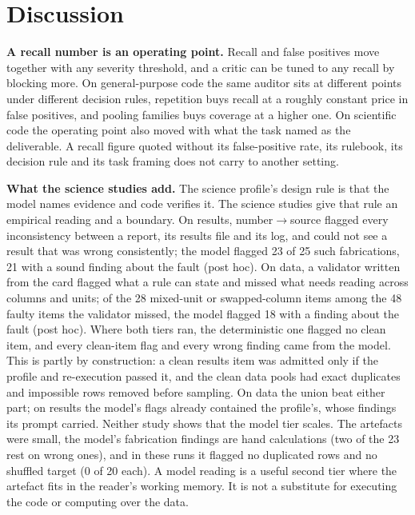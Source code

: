 \section{Discussion}
\label{sec:discussion}

\textbf{A recall number is an operating point.} Recall and false positives move together with any
severity threshold, and a critic can be tuned to any recall by blocking more. On general-purpose code
the same auditor sits at different points under different decision rules, repetition buys recall at
a roughly constant price in false positives, and pooling families buys coverage at a higher one. On
scientific code the operating point also moved with what the task named as the deliverable. A recall
figure quoted without its false-positive rate, its rulebook, its decision rule and its task framing
does not carry to another setting.

\textbf{What the science studies add.} The science profile's design rule is that the model names
evidence and code verifies it. The science studies give that rule an empirical reading and a
boundary. On results, number$\to$source flagged every inconsistency between a report, its results
file and its log, and could not see a result that was wrong consistently; the model flagged 23 of 25
such fabrications, 21 with a sound finding about the fault (post hoc). On data, a validator written
from the card flagged what a rule can state and missed what needs reading across columns and units;
of the 28 mixed-unit or swapped-column items among the 48 faulty items the validator missed, the model flagged 18 with a finding about the fault (post
hoc). Where both tiers ran, the deterministic one flagged no clean item, and every clean-item flag and every wrong finding came from the model. This is partly by construction: a clean results item was admitted only if the profile and re-execution passed it, and the clean data pools had exact duplicates and impossible rows removed before sampling. On data the union beat either part; on results the model's
flags already contained the profile's, whose findings its prompt carried. Neither study shows that
the model tier scales. The artefacts were small, the model's fabrication findings are hand
calculations (two of the 23 rest on wrong ones), and in these runs it flagged no duplicated rows and no shuffled target (0 of 20 each). A model reading is a useful second tier where the artefact fits in the reader's
working memory. It is not a substitute for executing the code or computing over the data.

